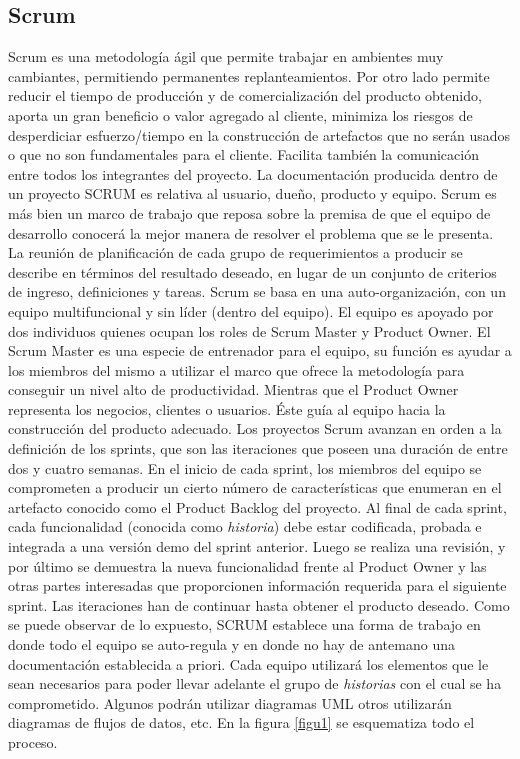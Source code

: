 \subsection{Scrum}
Scrum es una metodología ágil que permite trabajar en ambientes muy cambiantes, permitiendo permanentes replanteamientos. 
Por otro lado permite reducir el tiempo de producción y de comercialización del producto obtenido, aporta un gran beneficio o 
valor agregado al cliente, minimiza los riesgos de desperdiciar esfuerzo/tiempo en la construcción de artefactos que no serán usados 
o que no son fundamentales para el cliente. Facilita también la comunicación entre todos los integrantes del proyecto. 
La documentación producida dentro de un proyecto SCRUM es relativa al usuario, dueño, producto y equipo.  Scrum es más bien un marco de 
trabajo que reposa sobre la premisa de que el equipo de desarrollo conocerá la mejor manera de resolver el problema que se le presenta. 
La reunión de planificación de cada grupo de requerimientos a producir se describe en términos del resultado deseado, 
en lugar de un conjunto de criterios de ingreso, definiciones y tareas. 
Scrum se basa en una auto-organización, con un equipo multifuncional y sin líder (dentro del equipo). 
El equipo es apoyado por dos individuos quienes ocupan los roles de Scrum Master y  Product Owner. 
El Scrum Master es una especie de entrenador para el equipo, su función es ayudar a los miembros del mismo a utilizar el marco que ofrece 
la metodología para conseguir un nivel alto de productividad. Mientras que el Product Owner representa los negocios, clientes o 
usuarios. Éste guía al equipo hacia la construcción del producto adecuado.
 Los proyectos Scrum avanzan en orden a la definición de los sprints, que son las iteraciones que poseen una duración de entre dos y cuatro semanas. 
En el inicio de cada sprint, los miembros del equipo se comprometen a producir un cierto número de características que enumeran en 
el artefacto conocido como el Product Backlog del proyecto.  Al final de cada sprint, cada funcionalidad (conocida como \emph{historia}) debe estar codificada,
 probada e integrada a una versión demo del sprint anterior. Luego se realiza una revisión, y por último se demuestra la nueva funcionalidad
 frente al Product Owner y las otras partes interesadas que proporcionen información requerida para el siguiente sprint. 
Las iteraciones han de continuar hasta obtener el producto deseado.
Como se puede observar de lo expuesto, SCRUM establece una forma de trabajo en donde todo el equipo se auto-regula y en donde no hay de antemano
una documentación establecida a priori. Cada equipo utilizará los elementos que le sean necesarios  para poder llevar adelante el grupo de \emph{historias}
con el cual se ha comprometido. Algunos podrán utilizar diagramas UML\cite{} otros utilizarán diagramas de flujos de datos, etc.
En la figura \ref{figu1} se esquematiza todo el proceso.
